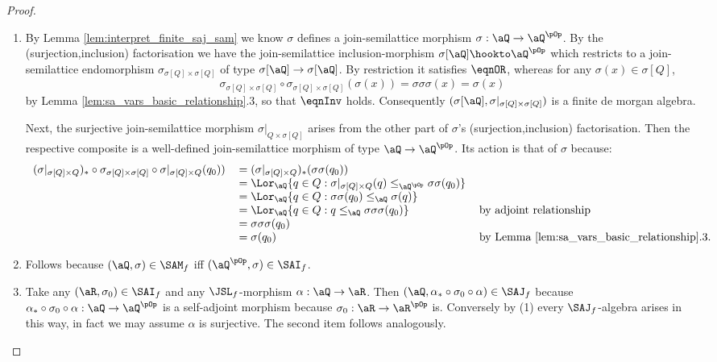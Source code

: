 \documentclass{article}
\begin{document}
\begin{proof}
\item
\begin{enumerate}
\item
By Lemma \ref{lem:interpret_finite_saj_sam} we know $\sigma$ defines a join-semilattice morphism $\sigma : \aQ \to \aQ^{\pOp}$. By the (surjection,inclusion) factorisation we have the join-semilattice inclusion-morphism $\sigma[\aQ] \hookto \aQ^{\pOp}$ which restricts to a join-semilattice endomorphism $\sigma_{\sigma[Q] \times \sigma[Q]}$ of type $\sigma[\aQ] \to \sigma[\aQ]$. By restriction it satisfies $\eqnOR$, whereas for any $\sigma(x) \in \sigma[Q]$,
\[
\sigma_{\sigma[Q] \times \sigma[Q]} \circ \sigma_{\sigma[Q] \times \sigma[Q]}(\sigma(x)) 
= \sigma\sigma\sigma(x) = \sigma(x)
\]
by Lemma \ref{lem:sa_vars_basic_relationship}.3, so that $\eqnInv$ holds. Consequently $(\sigma[\aQ],\sigma |_{\sigma[Q] \times \sigma[Q]})$ is a finite de morgan algebra.

Next, the surjective join-semilattice morphism $\sigma|_{Q \times \sigma[Q]}$ arises from the other part of $\sigma$'s (surjection,inclusion) factorisation. Then the respective composite is a well-defined join-semilattice morphism of type $\aQ \to \aQ^{\pOp}$. Its action is that of $\sigma$ because:
\[
\begin{tabular}{lll}
$(\sigma |_{\sigma[Q] \times Q})_* \circ \sigma_{\sigma[Q] \times \sigma[Q]} \circ \sigma |_{\sigma[Q] \times Q}(q_0))$
&
$= (\sigma |_{\sigma[Q] \times Q})_*(\sigma\sigma(q_0))$
\\&
$= \Lor_\aQ \{  q \in Q : \sigma |_{\sigma[Q] \times Q}(q) \leq_{\aQ^{\pOp}} \sigma\sigma(q_0) \}$
\\&
$= \Lor_\aQ \{  q \in Q : \sigma\sigma(q_0) \leq_\aQ \sigma(q) \}$
\\&
$= \Lor_\aQ \{ q \in Q : q \leq_\aQ \sigma\sigma\sigma(q_0)  \}$
& by adjoint relationship
\\&
$= \sigma\sigma\sigma(q_0)$
\\&
$= \sigma(q_0)$
& by Lemma \ref{lem:sa_vars_basic_relationship}.3.
\end{tabular}
\]

\item
Follows because $(\aQ,\sigma) \in \SAM_f$ iff $(\aQ^{\pOp},\sigma) \in \SAI_f$.

\item
Take any $(\aR,\sigma_0) \in \SAI_f$ and any $\JSL_f$-morphism $\alpha : \aQ \to \aR$. Then $(\aQ,\alpha_* \circ \sigma_0 \circ \alpha) \in \SAJ_f$ because $\alpha_* \circ \sigma_0 \circ \alpha : \aQ \to \aQ^{\pOp}$ is a self-adjoint morphism because $\sigma_0 : \aR \to \aR^{\pOp}$ is. Conversely by (1) every $\SAJ_f$-algebra arises in this way, in fact we may assume $\alpha$ is surjective. The second item follows analogously.

\end{enumerate}
\end{proof}
\end{document}
